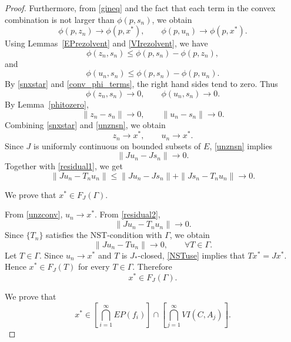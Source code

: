 \documentclass[leqno,12pt]{amsart}
\theoremstyle{definition}
\numberwithin{equation}{section}
\begin{document}
\begin{proof}
Furthermore, from \eqref{gineq} and the fact that each term in the convex combination is not larger than $\phi(p,s_n)$, we obtain
\begin{equation}\label{conv_phi_terms}
\phi(p,z_n)\to \phi(p,x^{*}),\qquad \phi(p,u_n)\to \phi(p,x^{*}).
\end{equation}
Using Lemmas~\ref{EPrezolvent} and \ref{VIrezolvent}, we have
\[
\phi(z_n,s_n)\leq \phi(p,s_n)-\phi(p,z_n),
\]
and
\[
\phi(u_n,s_n)\leq \phi(p,s_n)-\phi(p,u_n).
\]
By \eqref{snxstar} and \eqref{conv_phi_terms}, the right hand sides tend to zero. Thus
\[
\phi(z_n,s_n)\to 0,
\qquad
\phi(u_n,s_n)\to 0.
\]
By Lemma~\ref{phitozero},
\begin{equation}\label{unznsn}
\|z_n-s_n\|\to 0,
\qquad
\|u_n-s_n\|\to 0.
\end{equation}
Combining \eqref{snxstar} and \eqref{unznsn}, we obtain
\begin{equation}\label{unzconv}
z_n\to x^{*},
\qquad
u_n\to x^{*}.
\end{equation}
Since $J$ is uniformly continuous on bounded subsets of $E$, \eqref{unznsn} implies
\[
\|Ju_n-Js_n\|\to 0.
\]
Together with \eqref{residual1}, we get
\begin{equation}\label{residual2}
\|Ju_n-T_nu_n\|\leq \|Ju_n-Js_n\|+\|Js_n-T_nu_n\|\to 0.
\end{equation}

 We prove that $x^{*}\in F_J(\Gamma)$.

From \eqref{unzconv}, $u_n\to x^{*}$. From \eqref{residual2},
\[
\|Ju_n-T_nu_n\|\to 0.
\]
Since $\{T_n\}$ satisfies the NST-condition with $\Gamma$, we obtain
\begin{equation}\label{NSTuse}
\|Ju_n-Tu_n\|\to 0,
\qquad \forall T\in \Gamma.
\end{equation}
Let $T\in\Gamma$. Since $u_n\to x^{*}$ and $T$ is $J_{*}$-closed, \eqref{NSTuse} implies that $Tx^{*}=Jx^{*}$. Hence $x^{*}\in F_J(T)$ for every $T\in\Gamma$. Therefore
\begin{equation}\label{fixedmembership}
x^{*}\in F_J(\Gamma).
\end{equation}

 We prove that
\[
x^{*}\in \left[\bigcap_{i=1}^{\infty}EP(f_i)\right]\cap\left[\bigcap_{j=1}^{\infty}VI(C,A_j)\right].
\]


\end{proof}
\end{document}
